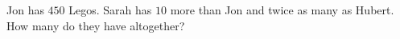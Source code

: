 Jon has $450$ Legos. Sarah has $10$ more than Jon and twice as many as Hubert. How many do they have altogether?

